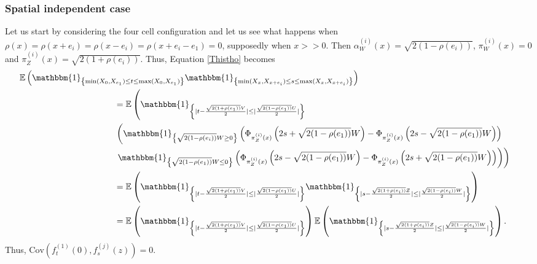 \documentclass[12pt]{article}
\theoremstyle{Theorem}
\begin{document}
\subsubsection{Spatial independent case} 
Let us start by considering the four cell configuration and let us see what happens when ${\rho(x) = \rho(x+e_i) = \rho(x-e_i) = \rho(x + e_i - e_1) = 0}$, supposedly when $x > > 0$. Then
$\alpha^{\scriptscriptstyle(i)}_{W}(x) = \sqrt{2(1-\rho(e_i))}$, $\pi^{\scriptscriptstyle(i)}_{W}(x) = 0$ and $\pi^{\scriptscriptstyle(i)}_{Z}(x) = \sqrt{2(1+\rho(e_i))}.$ Thus, Equation \eqref{Thistho} becomes 
{\small
\begin{align*}
\mathbb{E}\left(\mathbbm{1}_{\left\{\min(X_{\scriptscriptstyle 0}, X_{e_1}) \leq t \leq \max(X_{\scriptscriptstyle 0}, X_{e_1})\right\}}\mathbbm{1}_{\left\{\min(X_{\scriptscriptstyle x}, X_{x+e_i}) \leq s \leq \max(X_{\scriptscriptstyle x}, X_{x+e_i}) \right\}}\right) \nonumber \\
& \hspace{-10cm} = \mathbb{E}\left(\mathbbm{1}_{\left\{ |t - \frac{\sqrt{2(1+\rho(e_1))}V}{2}| \leq |\frac{\sqrt{2(1-\rho(e_1))}U}{2}|\right\}} \right.  \\
& \left. \hspace{-10cm} \left(\mathbbm{1}_{\left\{\sqrt{2(1-\rho(e_i))}W \geq 0\right\}} \left(\Phi_{\pi^{\scriptscriptstyle(i)}_{Z}(x)}\left( 2s + \sqrt{2(1-\rho(e_1))} W\right) - \Phi_{\pi^{\scriptscriptstyle(i)}_{Z}(x)}\left(2s - \sqrt{2(1-\rho(e_1))} W\right)\right) \right. \right. \\
&  \hspace{-10cm} \left. \left. \mathbbm{1}_{\left\{\sqrt{2(1-\rho(e_1))} W  \leq 0\right\}} \left(\Phi_{\pi^{\scriptscriptstyle(i)}_{Z}(x)}\left( 2s - \sqrt{2(1-\rho(e_1))}W \right) - \Phi_{\pi^{\scriptscriptstyle(i)}_{Z}(x)}\left(2s + \sqrt{2(1-\rho(e_1))} W\right)\right)\right)\right)\\ 
& \hspace{-10cm} = \mathbb{E}\left(\mathbbm{1}_{\left\{ |t - \frac{\sqrt{2(1+\rho(e_1))}V}{2}| \leq |\frac{\sqrt{2(1-\rho(e_1))}U}{2}|\right\}}\mathbbm{1}_{\left\{ |s - \frac{\sqrt{2(1+\rho(e_i))}Z}{2}| \leq |\frac{\sqrt{2(1-\rho(e_i))}W}{2}|\right\}}\right) \\
& \hspace{-10cm} = \mathbb{E}\left(\mathbbm{1}_{\left\{ |t - \frac{\sqrt{2(1+\rho(e_1))}V}{2}| \leq |\frac{\sqrt{2(1-\rho(e_1))}U}{2}|\right\}}\right)\mathbb{E}\left(\mathbbm{1}_{\left\{ |s - \frac{\sqrt{2(1+\rho(e_i))}Z}{2}| \leq |\frac{\sqrt{2(1-\rho(e_i))}W}{2}|\right\}}\right).
\end{align*}
}Thus, $\text{Cov}\left(f_{t}^{\scriptscriptstyle (1)}(0), f_{s}^{ \scriptscriptstyle (j)}(z)\right) = 0.$\\
\end{document}
